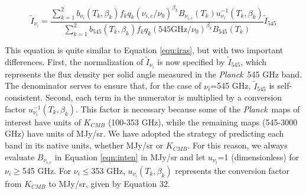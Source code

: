 \documentclass{emulateapj}
\newcommand{\PLANCK}{{\it Planck}}
\begin{document}
\begin{equation}
\label{eqn:inten}
\tilde{I}_{\nu_i} = \frac{\sum\limits_{k=1}^{2} b_{\nu_i}(T_k, \beta_k) f_k q_k (\nu_{i,c}/\nu_0)^{\beta_k} B_{\nu_{i,c}}(T_k) u_{\nu_i}^{-1}(T_k, \beta_k)}{\sum\limits_{k=1}^{2} b_{545}(T_k, \beta_k) f_k q_k (545 \textrm{GHz}/\nu_0)^{\beta_k} B_{545}(T_k)}\tilde{I}_{545}
\end{equation}

This equation is quite similar to Equation \ref{equ:iras}, but with two 
important differences. First, the normalization of $\tilde{I}_{\nu_i}$ is now 
specified by $\tilde{I}_{545}$, which represents the flux density per solid
angle measured in the \PLANCK~545 GHz band. The denominator serves to ensure 
that, for the case of $\nu_i$=545 GHz, $\tilde{I}_{545}$ is self-consistent. 
Second, each term in the numerator is multiplied by a conversion factor 
$u_{\nu_i}^{-1}(T_k, \beta_k)$. This factor is necessary because some of the 
\PLANCK~maps of interest have units of $K_{CMB}$ (100-353 GHz), while the
remaining maps (545-3000 GHz) have units of MJy/sr. We have adopted the 
strategy of predicting each band in its native units, whether MJy/sr or 
$K_{CMB}$. For this reason, we always evaluate $B_{\nu_{i,c}}$ in Equation 
\ref{eqn:inten} in MJy/sr and let $u_{\nu_i}$=1 (dimensionless) for 
$\nu_i$$\ge$545 GHz. For $\nu_i$$\le$353 GHz, $u_{\nu_i}(T_k, \beta_k)$ 
represents the conversion factor from $K_{CMB}$ to MJy/sr, given by 
\cite{planckresponse} Equation 32.



\end{document}
